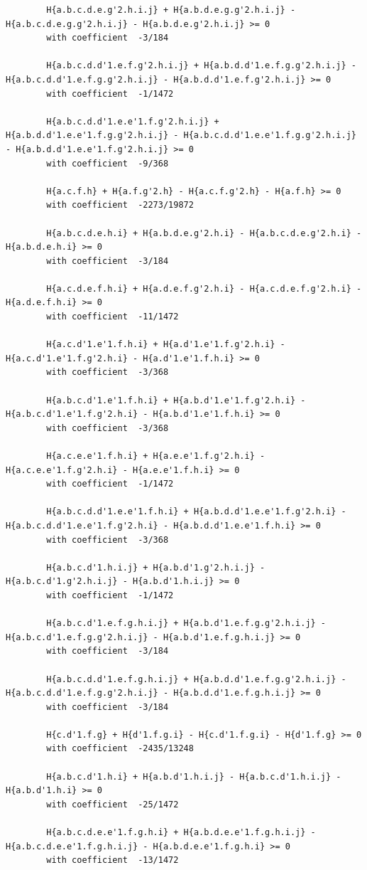\documentclass[11pt, a4paper]{kybernetika}
\begin{document}
\begin{verbatim}
		H{a.b.c.d.e.g'2.h.i.j} + H{a.b.d.e.g.g'2.h.i.j} - H{a.b.c.d.e.g.g'2.h.i.j} - H{a.b.d.e.g'2.h.i.j} >= 0
		with coefficient  -3/184
		
		H{a.b.c.d.d'1.e.f.g'2.h.i.j} + H{a.b.d.d'1.e.f.g.g'2.h.i.j} - H{a.b.c.d.d'1.e.f.g.g'2.h.i.j} - H{a.b.d.d'1.e.f.g'2.h.i.j} >= 0
		with coefficient  -1/1472
		
		H{a.b.c.d.d'1.e.e'1.f.g'2.h.i.j} + H{a.b.d.d'1.e.e'1.f.g.g'2.h.i.j} - H{a.b.c.d.d'1.e.e'1.f.g.g'2.h.i.j} - H{a.b.d.d'1.e.e'1.f.g'2.h.i.j} >= 0
		with coefficient  -9/368
		
		H{a.c.f.h} + H{a.f.g'2.h} - H{a.c.f.g'2.h} - H{a.f.h} >= 0
		with coefficient  -2273/19872
		
		H{a.b.c.d.e.h.i} + H{a.b.d.e.g'2.h.i} - H{a.b.c.d.e.g'2.h.i} - H{a.b.d.e.h.i} >= 0
		with coefficient  -3/184
		
		H{a.c.d.e.f.h.i} + H{a.d.e.f.g'2.h.i} - H{a.c.d.e.f.g'2.h.i} - H{a.d.e.f.h.i} >= 0
		with coefficient  -11/1472
		
		H{a.c.d'1.e'1.f.h.i} + H{a.d'1.e'1.f.g'2.h.i} - H{a.c.d'1.e'1.f.g'2.h.i} - H{a.d'1.e'1.f.h.i} >= 0
		with coefficient  -3/368
		
		H{a.b.c.d'1.e'1.f.h.i} + H{a.b.d'1.e'1.f.g'2.h.i} - H{a.b.c.d'1.e'1.f.g'2.h.i} - H{a.b.d'1.e'1.f.h.i} >= 0
		with coefficient  -3/368
		
		H{a.c.e.e'1.f.h.i} + H{a.e.e'1.f.g'2.h.i} - H{a.c.e.e'1.f.g'2.h.i} - H{a.e.e'1.f.h.i} >= 0
		with coefficient  -1/1472
		
		H{a.b.c.d.d'1.e.e'1.f.h.i} + H{a.b.d.d'1.e.e'1.f.g'2.h.i} - H{a.b.c.d.d'1.e.e'1.f.g'2.h.i} - H{a.b.d.d'1.e.e'1.f.h.i} >= 0
		with coefficient  -3/368
		
		H{a.b.c.d'1.h.i.j} + H{a.b.d'1.g'2.h.i.j} - H{a.b.c.d'1.g'2.h.i.j} - H{a.b.d'1.h.i.j} >= 0
		with coefficient  -1/1472
		
		H{a.b.c.d'1.e.f.g.h.i.j} + H{a.b.d'1.e.f.g.g'2.h.i.j} - H{a.b.c.d'1.e.f.g.g'2.h.i.j} - H{a.b.d'1.e.f.g.h.i.j} >= 0
		with coefficient  -3/184
		
		H{a.b.c.d.d'1.e.f.g.h.i.j} + H{a.b.d.d'1.e.f.g.g'2.h.i.j} - H{a.b.c.d.d'1.e.f.g.g'2.h.i.j} - H{a.b.d.d'1.e.f.g.h.i.j} >= 0
		with coefficient  -3/184
		
		H{c.d'1.f.g} + H{d'1.f.g.i} - H{c.d'1.f.g.i} - H{d'1.f.g} >= 0
		with coefficient  -2435/13248
		
		H{a.b.c.d'1.h.i} + H{a.b.d'1.h.i.j} - H{a.b.c.d'1.h.i.j} - H{a.b.d'1.h.i} >= 0
		with coefficient  -25/1472
		
		H{a.b.c.d.e.e'1.f.g.h.i} + H{a.b.d.e.e'1.f.g.h.i.j} - H{a.b.c.d.e.e'1.f.g.h.i.j} - H{a.b.d.e.e'1.f.g.h.i} >= 0
		with coefficient  -13/1472
		

\end{verbatim}
\end{document}
